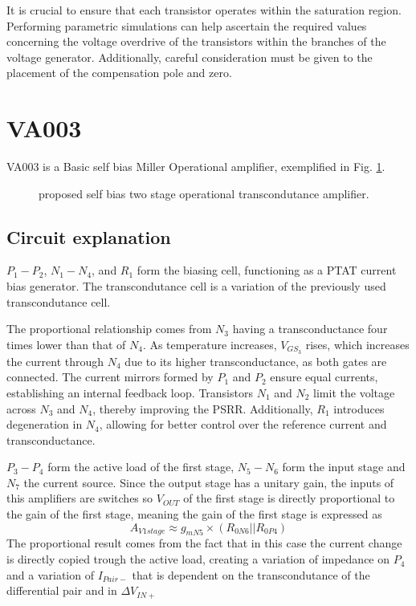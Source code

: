 \documentclass[12pt]{article}
\begin{document}
It is crucial to ensure that each transistor operates within the saturation region. Performing parametric simulations can help ascertain the required values concerning the voltage overdrive of the transistors within the branches of the voltage generator. Additionally, careful consideration must be given to the placement of the compensation pole and zero.
\newpage
\section{VA003}

VA003 is a Basic self bias Miller Operational amplifier, exemplified in Fig. \ref{VA003}.
\begin{figure}[H]
        \centering
        
        \caption{proposed self bias two stage operational transcondutance amplifier.}
        \label{VA003}
\end{figure}



\subsection{Circuit explanation}
$P_1 - P_2$, $N_1 - N_4$, and $R_1$ form the biasing cell, functioning as a PTAT current bias generator.  The transcondutance cell is a variation of the previously used transcondutance cell.

The proportional relationship comes from $N_3$ having a transconductance four times lower than that of $N_4$. As temperature increases, $V_{GS_3}$ rises, which increases the current through $N_4$ due to its higher transconductance, as both gates are connected. The current mirrors formed by $P_1$ and $P_2$ ensure equal currents, establishing an internal feedback loop. Transistors $N_1$ and $N_2$ limit the voltage across $N_3$ and $N_4$, thereby improving the PSRR. Additionally, $R_1$ introduces degeneration in $N_4$, allowing for better control over the reference current and transconductance.


$P_3-P_4$ form the active load of the first stage, $N_5-N_6$ form the input stage and $N_7$ the current source.
Since the output stage has a unitary gain, the inputs of this amplifiers are switches so $V_{OUT}$ of the first stage is directly proportional to the gain of the first stage, meaning the gain of the first stage is expressed as
\begin{equation}
    A_{V1stage} \approx g_{mN5} \times (R_{0N6}||R_{0P4})
\end{equation}
The proportional result comes from the fact that in this case the current change is directly copied trough the active load, creating a variation of impedance on $P_4$ and a variation of $I_{Pair-}$ that is dependent on the transcondutance of the differential pair and in $\Delta V_{IN+}$
\end{document}

